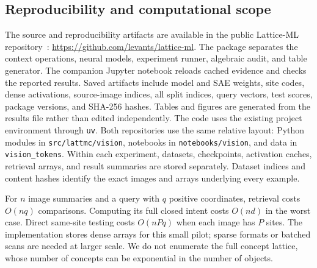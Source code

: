 \subsection{Reproducibility and computational scope}
\label{sub:reproducibility}
The source and reproducibility artifacts are available in the public
Lattice-ML repository~\cite{tsinadzeLatticeML}:
\url{https://github.com/levants/lattice-ml}.
The package separates the context operations, neural models,
experiment runner, algebraic audit, and table generator. The companion
Jupyter notebook reloads cached evidence and checks the reported results.
Saved artifacts include model and SAE weights, site codes, dense
activations, source-image indices, all split indices, query vectors,
test scores, package versions, and SHA-256 hashes. Tables and figures
are generated from the results file rather than edited independently.
The code uses the existing project environment through \texttt{uv}.
Both repositories use the same relative layout: Python modules in
\texttt{src/lattmc/vision}, notebooks in \texttt{notebooks/vision},
and data in \texttt{vision\_tokens}. Within each experiment, datasets,
checkpoints, activation caches, retrieval arrays, and result summaries
are stored separately. Dataset indices and content hashes identify the
exact images and arrays underlying every example.

For $n$ image summaries and a query with $q$ positive coordinates,
retrieval costs $O(nq)$ comparisons. Computing its full closed intent
costs $O(nd)$ in the worst case. Direct same-site testing costs
$O(nPq)$ when each image has $P$ sites. The implementation stores dense
arrays for this small pilot; sparse formats or batched scans are needed
at larger scale. We do not enumerate the full concept lattice, whose
number of concepts can be exponential in the number of objects.
